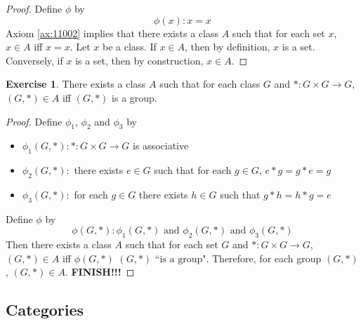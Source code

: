 \documentclass[12pt]{amsart}
\theoremstyle{definition}
\newtheorem{ex}[definition]{Exercise}
\DeclareMathOperator*{\0}{\mbf{0}}
\DeclareMathOperator*{\1}{\mbf{1}}
\newcommand{\lex}[1]{\label{ex:#1}}
\newcommand{\rax}[1]{Axiom \ref{ax:#1}}
\begin{document}
	\begin{proof}
		Define $\phi$ by $$\phi(x) : x = x$$ 
		\rax{11002} implies that there exists a class $A$ such that for each set $x$, $x \in A$ iff $x = x$. Let $x$ be a class. If $x \in A$, then by definition, $x$ is a set. \\
		Conversely, if $x$ is a set, then by construction, $x \in A$.
	\end{proof}
	
	\begin{ex} \lex{11004}
		There exists a class $A$ such that for each class $G$ and $*: G \times G \rightarrow G$, $(G, *) \in A$ iff $(G, *)$ is a group.
	\end{ex}
	
	\begin{proof}
		Define $\phi_1$, $\phi_2$ and $\phi_3$ by 
		\begin{itemize}
			\item $\phi_1(G, *): *:G \times G \rightarrow G$ is associative
			\item $\phi_2(G, *):$ there exists $e \in G$ such that for each $g \in G$, $e * g = g * e = g$
			\item $\phi_3(G, *):$ for each $g \in G$ there exists $h \in G$ such that $g * h = h * g = e$
		\end{itemize}
		Define $\phi$ by 
		$$\phi(G, *) : \phi_1(G, *) \text{ and } \phi_2(G, *) \text{ and } \phi_3(G, *)$$
		Then there exists a class $A$ such that for each set $G$ and  $*: G \times G \rightarrow G$, $(G, *) \in A$ iff $\phi(G, *)$ $(G, *) \text{ ``is a group"}$. Therefore, for each group $(G, *)$, $(G, *) \in A$.
		\textbf{FINISH!!!}
	\end{proof}

	
	
	
	
	
	
	
	
	
	
	
	
	
	
	
	
	
	
	
	
	
	
	
	
	
	
	
	
	
	
	
	
	
	
	
	\newpage
	\subsection{Categories}
	
\end{document}
